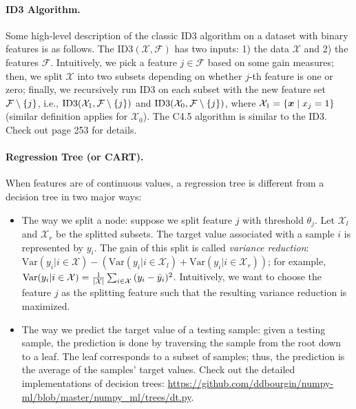     \paragraph{ID3 Algorithm.} Some high-level description of the classic ID3 algorithm on a dataset with binary features is as follows.
    The $\text{ID3}(\mathcal{X}, \mathcal{F})$ has two inputs: 1) the data $\mathcal{X}$ and 2) the features $\mathcal{F}$.
    Intuitively, we pick a feature $j \in \mathcal{F}$ based on some gain measures; then, we split $\mathcal{X}$ into two subsets depending on whether $j$-th feature is one or zero; finally, we recursively run ID3 on each subset  with the new feature set $\mathcal{F} \setminus \{ j \}$, i.e., $\text{ID3}(\mathcal{X}_1, \mathcal{F} \setminus \{ j \})$ and $\text{ID3}(\mathcal{X}_0, \mathcal{F} \setminus \{ j \})$, where $\mathcal{X}_1 = \{ \bm{x} \mid x_j = 1 \}$ (similar definition applies for $\mathcal{X}_0$).
    The C4.5 algorithm is similar to the ID3. 
    Check out \cite{shalev2014understanding} page 253 for details. 

    \paragraph{Regression Tree (or CART).} 
    When features are of continuous values, a regression tree is different from a decision tree in two major ways:
        \begin{itemize}
            \item The way we split a node: suppose we split feature $j$ with threshold $\theta_j$.
            Let $\mathcal{X}_l$ and $\mathcal{X}_r$ be the splitted subsets. 
            The target value associated with a sample $i$ is represented by $y_i$.
            The gain of this split is called \emph{variance reduction}:
            $\text{Var}(y_i | i \in \mathcal{X}) - \left( \text{Var}(y_i | i \in \mathcal{X}_l) + \text{Var}(y_i | i \in \mathcal{X}_r) \right)$; for example, $\text{Var}(y_i | i \in \mathcal{X}) = \frac{1}{| \mathcal{X} |}\sum_{i \in \mathcal{X}}^{}{(y_i - \bar{y}_i)^2}$. Intuitively, we want to choose the feature $j$ as the splitting feature such that the resulting variance reduction is maximized.
            \item The way we predict the target value of a testing sample: given a testing sample, the prediction is done by traversing the sample from the root down to a leaf.
            The leaf corresponds to a subset of samples; thus, the prediction is the average of the samples' target values.
            Check out the detailed implementations of decision trees: \url{https://github.com/ddbourgin/numpy-ml/blob/master/numpy_ml/trees/dt.py}.
        \end{itemize}
        
